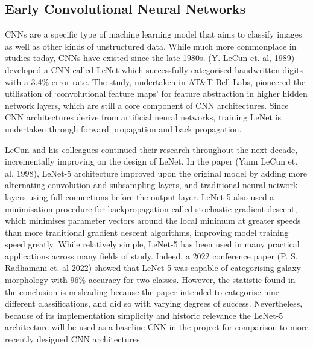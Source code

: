\documentclass[12pt,runningheads]{llncs}
\begin{document}
\subsection{Early Convolutional Neural Networks}
CNNs are a specific type of machine learning model that aims to
classify images as well as other kinds of unstructured data. While much
more commonplace in studies today, CNNs have existed since the late
1980s. (Y. LeCun et. al, 1989) developed a CNN called LeNet
which successfully categorised handwritten digits with a 3.4\% error
rate. The study, undertaken in AT\&T Bell Labs, pioneered the
utilisation of `convolutional feature maps' for feature abstraction in
higher hidden network layers, which are still a core component of CNN
architectures. Since CNN architectures derive from artificial neural
networks, training LeNet is undertaken through forward propagation
and back propagation.

LeCun and his colleagues continued their research throughout the next
decade, incrementally improving on the design of LeNet. In the paper
(Yann LeCun et. al, 1998), LeNet-5 architecture improved upon the
original model by adding more alternating convolution and subsampling
layers, and traditional neural network layers using full connections
before the output layer. LeNet-5 also used a minimisation procedure
for backpropagation called stochastic gradient descent, which minimises
parameter vectors around the local minimum at greater speeds than more
traditional gradient descent algorithms, improving model training speed
greatly. While relatively simple, LeNet-5 has been used in many
practical applications across many fields of study. Indeed, a 2022
conference paper (P. S. Radhamani et. al 2022) showed that
LeNet-5 was capable of categorising galaxy morphology with 96\%
accuracy for two classes. However, the statistic found in the conclusion
is misleading because the paper intended to categorise nine different
classifications, and did so with varying degrees of success.
Nevertheless, because of its implementation simplicity and historic
relevance the LeNet-5 architecture will be used as a baseline CNN in
the project for comparison to more recently designed CNN architectures.

\newpage
\end{document}
